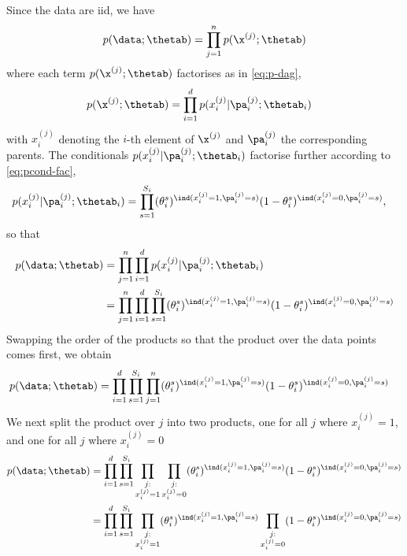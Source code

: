 \begin{exenumerate}
  \begin{solution}
    Since the data are iid, we have
    \begin{align}
      p(\data; \thetab) & = \prod_{j=1}^n p(\x^{(j)}; \thetab) \\
    \end{align}
    where each term $p(\x^{(j)}; \thetab)$ factorises as in \eqref{eq:p-dag},
    \begin{align}
      p(\x^{(j)}; \thetab) &= \prod_{i=1}^d p(x_i^{(j)} | \pa_i^{(j)}; \thetab_i)
    \end{align}
    with $x_i^{(j)}$ denoting the $i$-th element of $\x^{(j)}$ and $\pa_i^{(j)}$ the corresponding parents. The conditionals $p(x_i^{(j)} | \pa_i^{(j)}; \thetab_i)$ factorise further according to \eqref{eq:pcond-fac},
 \begin{align}
   p(x_i^{(j)} | \pa_i^{(j)}; \thetab_i) &= \prod_{s=1}^{S_i} (\theta_i^s)^{\ind(x_i^{(j)}=1, \pa_i^{(j)}=s)} (1-\theta_i^s)^{\ind(x_i^{(j)}=0, \pa_i^{(j)}=s)},
  \end{align}
 so that
 \begin{align}
   p(\data; \thetab) & = \prod_{j=1}^n \prod_{i=1}^d p(x_i^{(j)} | \pa_i^{(j)}; \thetab_i)\\
   & =  \prod_{j=1}^n  \prod_{i=1}^d \prod_{s=1}^{S_i} (\theta_i^s)^{\ind(x_i^{(j)}=1, \pa_i^{(j)}=s)} (1-\theta_i^s)^{\ind(x_i^{(j)}=0, \pa_i^{(j)}=s)}
 \end{align}
 Swapping the order of the products so that the product over the data points comes first, we obtain
 \begin{align}
   p(\data; \thetab)  & = \prod_{i=1}^d \prod_{s=1}^{S_i} \prod_{j=1}^n(\theta_i^s)^{\ind(x_i^{(j)}=1, \pa_i^{(j)}=s)} (1-\theta_i^s)^{\ind(x_i^{(j)}=0, \pa_i^{(j)}=s)}
 \end{align}
 We next split the product over $j$ into two products, one for all $j$ where $x_i^{(j)}=1$, and one for all $j$ where $x_i^{(j)}=0$
   \begin{align}
p(\data; \thetab)   &=  \prod_{i=1}^d \prod_{s=1}^{S_i} \prod_{\substack{j: \\x_i^{(j)}=1}}\prod_{\substack{j: \\x_i^{(j)}=0}} (\theta_i^s)^{\ind(x_i^{(j)}=1, \pa_i^{(j)}=s)} (1-\theta_i^s)^{\ind(x_i^{(j)}=0, \pa_i^{(j)}=s)}\\
    &=  \prod_{i=1}^d \prod_{s=1}^{S_i} \prod_{\substack{j: \\x_i^{(j)}=1}} (\theta_i^s)^{\ind(x_i^{(j)}=1, \pa_i^{(j)}=s)} \prod_{\substack{j: \\x_i^{(j)}=0}}(1-\theta_i^s)^{\ind(x_i^{(j)}=0, \pa_i^{(j)}=s)}\\

\end{align}
\end{solution}
\end{exenumerate}
